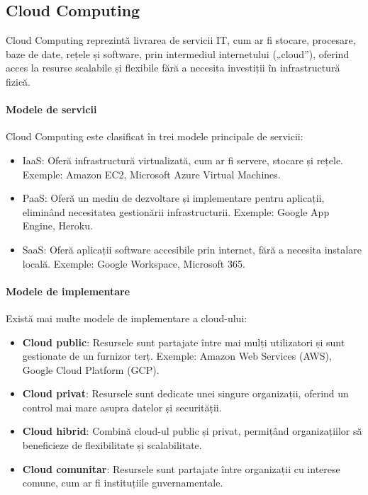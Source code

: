 \documentclass[titlepage,12pt]{article}
\begin{document}
\subsection{Cloud Computing}

Cloud Computing reprezintă livrarea de servicii IT, cum ar fi stocare, procesare, baze de date, rețele și software, prin intermediul internetului („cloud”), oferind acces la resurse scalabile și flexibile fără a necesita investiții în infrastructură fizică.

\paragraph{Modele de servicii}
Cloud Computing este clasificat în trei modele principale de servicii:
\begin{itemize}
    \item \ac {IaaS}: Oferă infrastructură virtualizată, cum ar fi servere, stocare și rețele. Exemple: Amazon EC2, Microsoft Azure Virtual Machines.
    \item \ac {PaaS}: Oferă un mediu de dezvoltare și implementare pentru aplicații, eliminând necesitatea gestionării infrastructurii. Exemple: Google App Engine, Heroku.
    \item \ac {SaaS}: Oferă aplicații software accesibile prin internet, fără a necesita instalare locală. Exemple: Google Workspace, Microsoft 365.
\end{itemize}

\paragraph{Modele de implementare}
Există mai multe modele de implementare a cloud-ului:
\begin{itemize}
    \item \textbf{Cloud public}: Resursele sunt partajate între mai mulți utilizatori și sunt gestionate de un furnizor terț. Exemple: Amazon Web Services (AWS), Google Cloud Platform (GCP).
    \item \textbf{Cloud privat}: Resursele sunt dedicate unei singure organizații, oferind un control mai mare asupra datelor și securității.
    \item \textbf{Cloud hibrid}: Combină cloud-ul public și privat, permițând organizațiilor să beneficieze de flexibilitate și scalabilitate.
    \item \textbf{Cloud comunitar}: Resursele sunt partajate între organizații cu interese comune, cum ar fi instituțiile guvernamentale.
\end{itemize}
\end{document}
